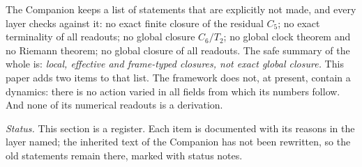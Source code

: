 The Companion keeps a list of statements that are explicitly not made, and every layer checks against it: no exact finite closure of
the residual \(C_5\); no exact terminality of all readouts; no global closure \(C_6/T_2\); no global clock theorem and no Riemann theorem;
no global closure of all readouts.  The safe summary of the whole is: \emph{local, effective and frame-typed closures, not exact global
closure.}  This paper adds two items to that list.  The framework does not, at present, contain a dynamics: there is no action varied in
all fields from which its numbers follow.  And none of its numerical readouts is a derivation.

\medskip\noindent\emph{Status.}  This section is a register.  Each item is documented with its reasons in the layer named; the
inherited text of the Companion has not been rewritten, so the old statements remain there, marked with status notes.
